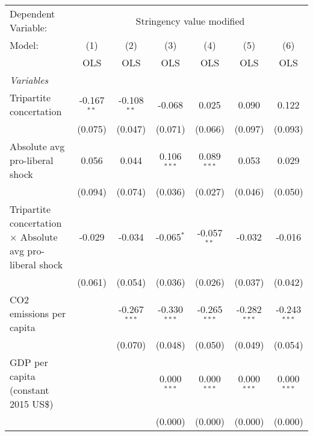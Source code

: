
\begingroup
\centering
\begin{tabular}{lcccccc}
   \toprule
   Dependent Variable: & \multicolumn{6}{c}{Stringency value modified}\\
   Model:                                                           & (1)           & (2)            & (3)            & (4)            & (5)            & (6)\\  
                                                                    &  OLS          & OLS            & OLS            & OLS            & OLS            & OLS\\  
   \midrule
   \emph{Variables}\\
   Tripartite concertation                                          & -0.167$^{**}$ & -0.108$^{**}$  & -0.068         & 0.025          & 0.090          & 0.122\\   
                                                                    & (0.075)       & (0.047)        & (0.071)        & (0.066)        & (0.097)        & (0.093)\\   
   Absolute avg pro-liberal shock                                   & 0.056         & 0.044          & 0.106$^{***}$  & 0.089$^{***}$  & 0.053          & 0.029\\   
                                                                    & (0.094)       & (0.074)        & (0.036)        & (0.027)        & (0.046)        & (0.050)\\   
   Tripartite concertation $\times$ Absolute avg pro-liberal shock  & -0.029        & -0.034         & -0.065$^{*}$   & -0.057$^{**}$  & -0.032         & -0.016\\   
                                                                    & (0.061)       & (0.054)        & (0.036)        & (0.026)        & (0.037)        & (0.042)\\   
   CO2 emissions per capita                                         &               & -0.267$^{***}$ & -0.330$^{***}$ & -0.265$^{***}$ & -0.282$^{***}$ & -0.243$^{***}$\\   
                                                                    &               & (0.070)        & (0.048)        & (0.050)        & (0.049)        & (0.054)\\   
   GDP per capita (constant 2015 US\$)                              &               &                & 0.000$^{***}$  & 0.000$^{***}$  & 0.000$^{***}$  & 0.000$^{***}$\\   
                                                                    &               &                & (0.000)        & (0.000)        & (0.000)        & (0.000)\\   

\end{tabular}
